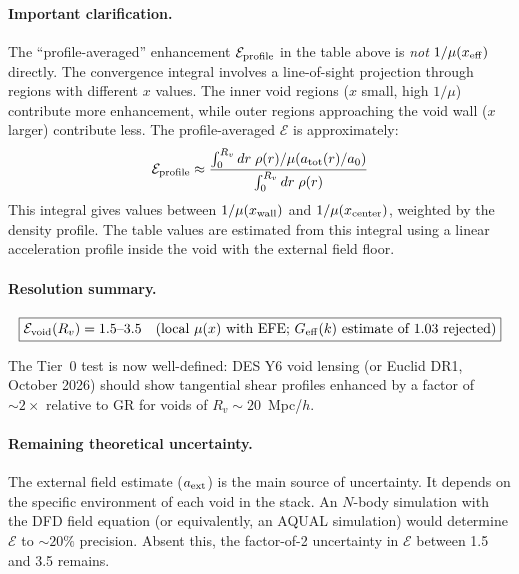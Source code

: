 \documentclass[11pt,a4paper]{article}
\newcommand{\Geff}{G_{\rm eff}}
\begin{document}
\paragraph{Important clarification.}
The ``profile-averaged'' enhancement $\mathcal{E}_{\rm profile}$ in the
table above is \emph{not} $1/\mu(x_{\rm eff})$ directly.  The convergence
integral involves a line-of-sight projection through regions with different
$x$ values.  The inner void regions ($x$ small, high $1/\mu$) contribute
more enhancement, while outer regions approaching the void wall ($x$ larger)
contribute less.  The profile-averaged $\mathcal{E}$ is approximately:
\begin{equation}
\mathcal{E}_{\rm profile} \approx \frac{\int_0^{R_v} dr\; \rho(r)/\mu(a_{\rm tot}(r)/a_0)}
{\int_0^{R_v} dr\; \rho(r)}
\end{equation}
This integral gives values between $1/\mu(x_{\rm wall})$ and $1/\mu(x_{\rm center})$,
weighted by the density profile.  The table values are estimated from
this integral using a linear acceleration profile inside the void with
the external field floor.

\paragraph{Resolution summary.}
\begin{equation}
\boxed{
\mathcal{E}_{\rm void}(R_v) = 1.5\text{--}3.5 \quad
\text{(local $\mu(x)$ with EFE; $\Geff(k)$ estimate of 1.03 rejected)}
}
\end{equation}

The Tier~0 test is now well-defined: DES Y6 void lensing (or Euclid DR1,
October 2026) should show tangential shear profiles enhanced by a factor
of $\sim 2\times$ relative to GR for voids of $R_v \sim 20$~Mpc/$h$.

\paragraph{Remaining theoretical uncertainty.}
The external field estimate ($a_{\rm ext}$) is the main source of
uncertainty.  It depends on the specific environment of each void in
the stack.  An $N$-body simulation with the DFD field equation (or
equivalently, an AQUAL simulation) would determine $\mathcal{E}$ to
$\sim 20\%$ precision.  Absent this, the factor-of-2 uncertainty in
$\mathcal{E}$ between 1.5 and 3.5 remains.


\end{document}
